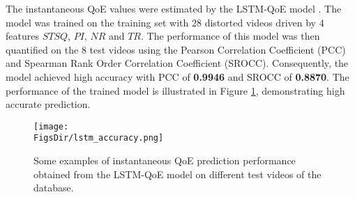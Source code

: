 The instantaneous QoE values were estimated by the LSTM-QoE model \cite{QoEModel_LSTM}. The model was trained on the training set with 28 distorted videos driven by 4 features $STSQ$, $PI$, $NR$ and $TR$. The performance of this model was then quantified on the 8 test videos using the Pearson Correlation Coefficient (PCC) and Spearman Rank Order Correlation Coefficient (SROCC). Consequently, the model achieved high accuracy with PCC of \textbf{0.9946} and SROCC of \textbf{0.8870}. The performance of the trained model is illustrated in Figure \ref{fig:LSTM_Performance}, demonstrating high accurate prediction. 

\begin{figure}[tb]
  \centering
  \texttt{[image: \\FigsDir/lstm\_accuracy.png]}
  \caption{Some examples of instantaneous QoE prediction performance obtained from the LSTM-QoE model on different test videos of the database.}
  \label{fig:LSTM_Performance}
\end{figure}